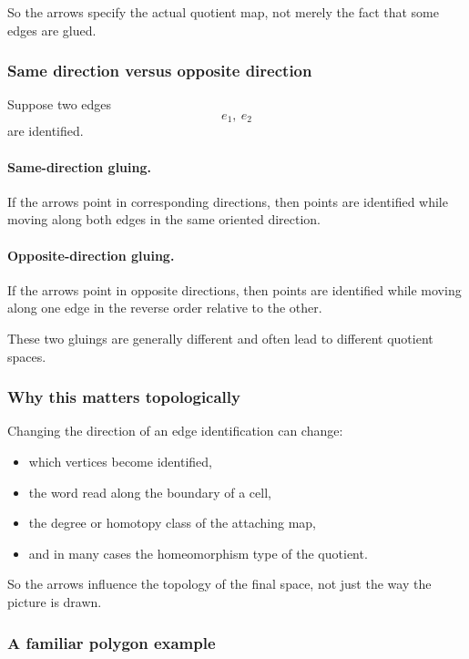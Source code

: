 \documentclass[12pt,a4paper]{article}
\theoremstyle{notespace}
\begin{document}
So the arrows specify the actual quotient map, not merely the fact that some edges are glued.

\subsubsection{Same direction versus opposite direction}

Suppose two edges
\[
e_1,\ e_2
\]
are identified.

\paragraph{Same-direction gluing.}
If the arrows point in corresponding directions, then points are identified while moving along both edges in the same oriented direction.

\paragraph{Opposite-direction gluing.}
If the arrows point in opposite directions, then points are identified while moving along one edge in the reverse order relative to the other.

These two gluings are generally different and often lead to different quotient spaces.

\subsubsection{Why this matters topologically}

Changing the direction of an edge identification can change:

\begin{itemize}
	\item which vertices become identified,
	\item the word read along the boundary of a cell,
	\item the degree or homotopy class of the attaching map,
	\item and in many cases the homeomorphism type of the quotient.
\end{itemize}

So the arrows influence the topology of the final space, not just the way the picture is drawn.

\subsubsection{A familiar polygon example}
\end{document}
